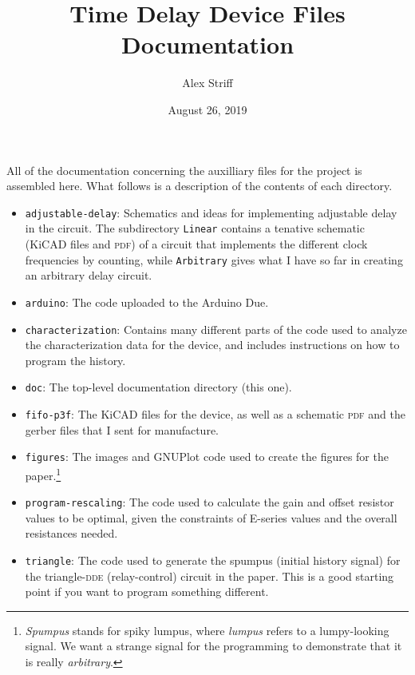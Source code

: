 \documentclass[11pt,letterpaper]{article}
\title{Time Delay Device Files Documentation}
\author{Alex Striff}
\date{August 26, 2019}
\begin{document}
\maketitle

All of the documentation concerning the auxilliary files for the project is
assembled here. What follows is a description of the contents of each directory.

\begin{itemize}
  \item \texttt{adjustable-delay}: Schematics and ideas for implementing
    adjustable delay in the circuit. The subdirectory \texttt{Linear} contains a
    tenative schematic (KiCAD files and \textsc{pdf}) of a circuit that
    implements the different clock frequencies by counting, while
    \texttt{Arbitrary} gives what I have so far in creating an arbitrary delay
    circuit.
  \item \texttt{arduino}: The code uploaded to the Arduino Due.
  \item \texttt{characterization}: Contains many different parts of the
    code used to analyze the characterization data for the device, and includes
    instructions on how to program the history.
  \item \texttt{doc}: The top-level documentation directory (this one).
  \item \texttt{fifo-p3f}: The KiCAD files for the device, as well as a
    schematic \textsc{pdf} and the gerber files that I sent for manufacture.
  \item \texttt{figures}: The images and GNUPlot code used to create the figures
    for the paper.\footnote{\emph{Spumpus} stands for spiky lumpus, where
      \emph{lumpus} refers to a lumpy-looking signal. We want a strange signal
    for the programming to demonstrate that it is really \emph{arbitrary}.}
  \item \texttt{program-rescaling}: The code used to calculate the gain and
    offset resistor values to be optimal, given the constraints of E-series
    values and the overall resistances needed.
  \item \texttt{triangle}: The code used to generate the spumpus (initial
    history signal) for the triangle-\textsc{dde} (relay-control) circuit in the
    paper. This is a good starting point if you want to program something
    different.
\end{itemize}
\end{document}
